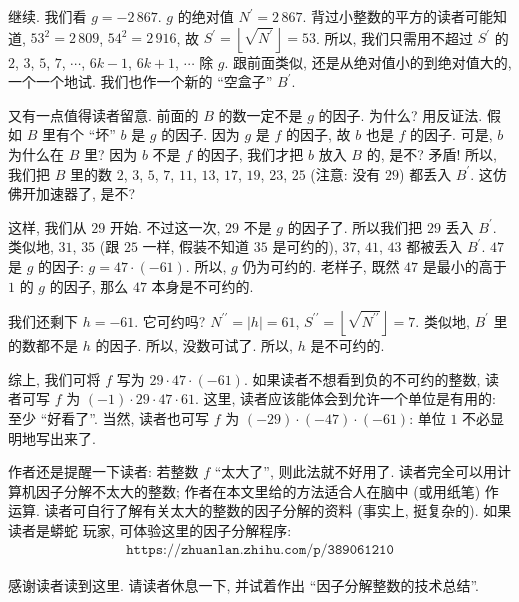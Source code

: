 \begin{example}
    继续. 我们看 $g = -2\,867$. $g$ 的绝对值 $N^{\prime} = 2\,867$. 背过小整数的平方的读者可能知道, $53^2 = 2\,809$, $54^2 = 2\,916$, 故 $S^{\prime} = \left \lfloor \sqrt{N^{\prime}} \right \rfloor = 53$. 所以, 我们只需用不超过 $S^{\prime}$ 的 $2$, $3$, $5$, $7$, $\cdots$, $6k-1$, $6k+1$, $\cdots$ 除 $g$. 跟前面类似, 还是从绝对值小的到绝对值大的, 一个一个地试. 我们也作一个新的 ``空盒子'' $B^{\prime}$.

    又有一点值得读者留意. 前面的 $B$ 的数一定不是 $g$ 的因子. 为什么? 用反证法. 假如 $B$ 里有个 ``坏'' $b$ 是 $g$ 的因子. 因为 $g$ 是 $f$ 的因子, 故 $b$ 也是 $f$ 的因子. 可是, $b$ 为什么在 $B$ 里? 因为 $b$ 不是 $f$ 的因子, 我们才把 $b$ 放入 $B$ 的, 是不? 矛盾! 所以, 我们把 $B$ 里的数 $2$, $3$, $5$, $7$, $11$, $13$, $17$, $19$, $23$, $25$ (注意: 没有 $29$) 都丢入 $B^{\prime}$. 这仿佛开加速器了, 是不?

    这样, 我们从 $29$ 开始. 不过这一次, $29$ 不是 $g$ 的因子了. 所以我们把 $29$ 丢入 $B^{\prime}$. 类似地, $31$, $35$ (跟 $25$ 一样, 假装不知道 $35$ 是可约的), $37$, $41$, $43$ 都被丢入 $B^{\prime}$. $47$ 是 $g$ 的因子: $g = 47 \cdot (-61)$. 所以, $g$ 仍为可约的. 老样子, 既然 $47$ 是最小的高于 $1$ 的 $g$ 的因子, 那么 $47$ 本身是不可约的.

    我们还剩下 $h = -61$. 它可约吗? $N^{\prime \prime} = |h| = 61$, $S^{\prime \prime} = \left \lfloor \sqrt{N^{\prime \prime}} \right \rfloor = 7$. 类似地, $B^{\prime}$ 里的数都不是 $h$ 的因子. 所以, 没数可试了. 所以, $h$ 是不可约的.

    综上, 我们可将 $f$ 写为 $29 \cdot 47 \cdot (-61)$. 如果读者不想看到负的不可约的整数, 读者可写 $f$ 为 $(-1) \cdot 29 \cdot 47 \cdot 61$. 这里, 读者应该能体会到允许一个单位是有用的: 至少 ``好看了''. 当然, 读者也可写 $f$ 为 $(-29) \cdot (-47) \cdot (-61)$: 单位 $1$ 不必显明地写出来了.
\end{example}

\begin{remark}
    作者还是提醒一下读者: 若整数 $f$ ``太大了'', 则此法就不好用了. 读者完全可以用计算机因子分解不太大的整数; 作者在本文里给的方法适合人在脑中 (或用纸笔) 作运算. 读者可自行了解有关太大的整数的因子分解的资料 (事实上, 挺复杂的). 如果读者是蟒蛇  玩家, 可体验这里的因子分解程序:
    \begin{align*}
        \texttt{https://zhuanlan.zhihu.com/p/389061210}
    \end{align*}
\end{remark}

感谢读者读到这里. 请读者休息一下, 并试着作出 ``因子分解整数的技术总结''.


